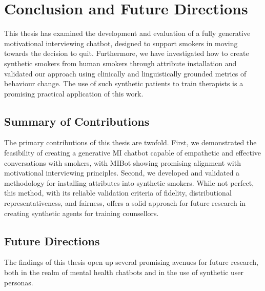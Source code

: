 \chapter{Conclusion and Future Directions}
\label{ch:conclusion}

This thesis has examined the development and evaluation of a fully generative motivational interviewing chatbot, designed to support smokers in moving towards the decision to quit. Furthermore, we have investigated how to create synthetic smokers from human smokers through attribute installation and validated our approach using clinically and linguistically grounded metrics of behaviour change. The use of such synthetic patients to train therapists is a promising practical application of this work.


\section{Summary of Contributions}

The primary contributions of this thesis are twofold. First, we demonstrated the feasibility of creating a generative MI chatbot capable of empathetic and effective conversations with smokers, with MIBot showing promising alignment with motivational interviewing principles. Second, we developed and validated a methodology for installing attributes into synthetic smokers. While not perfect, this method, with its reliable validation criteria of fidelity, distributional representativeness, and fairness, offers a solid approach for future research in creating synthetic agents for training counsellors.


\section{Future Directions}
The findings of this thesis open up several promising avenues for future research, both in the realm of mental health chatbots and in the use of synthetic user personas.

